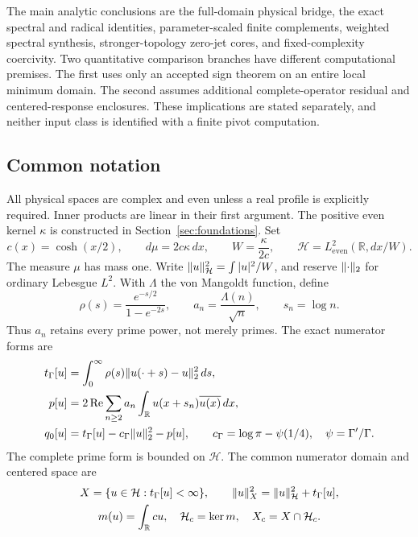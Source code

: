 \documentclass[11pt,a4paper]{article}
\numberwithin{equation}{section}
\theoremstyle{definition}\newtheorem{definition}[theorem]{Definition}
\theoremstyle{remark}\newtheorem{remark}[theorem]{Remark}
\newcommand{\R}{\mathbb R}\newcommand{\C}{\mathbb C}\newcommand{\N}{\mathbb N}
\newcommand{\Hh}{\mathcal H}\newcommand{\Hw}{\mathcal H}
\newcommand{\tg}{t_\Gamma}\newcommand{\cg}{c_\Gamma}
\begin{document}
The main analytic conclusions are the full-domain physical bridge, the exact spectral and radical identities, parameter-scaled finite complements, weighted spectral synthesis, stronger-topology zero-jet cores, and fixed-complexity coercivity. Two quantitative comparison branches have different computational premises. The first uses only an accepted sign theorem on an entire local minimum domain. The second assumes additional complete-operator residual and centered-response enclosures. These implications are stated separately, and neither input class is identified with a finite pivot computation.

\subsection{Common notation}
All physical spaces are complex and even unless a real profile is explicitly required. Inner products are linear in their first argument. The positive even kernel $\kappa$ is constructed in Section~\ref{sec:foundations}. Set
\begin{equation}\label{a:eq:weights}
 c(x)=\cosh(x/2),\qquad d\mu=2c\kappa\,dx,\qquad
 W=\frac{\kappa}{2c},\qquad \Hh=L^2_{\mathrm{even}}(\R,dx/W).
\end{equation}
The measure $\mu$ has mass one. Write $\norm{u}_{\Hh}^2=\int|u|^2/W$, and reserve $\lVert\cdot\rVert_2$ for ordinary Lebesgue $L^2$. With $\Lambda$ the von Mangoldt function, define
\begin{equation}\label{eq:common-shifts}
 \rho(s)=\frac{e^{-s/2}}{1-e^{-2s}},\qquad
 a_n=\frac{\Lambda(n)}{\sqrt n},\qquad s_n=\log n.
\end{equation}
Thus $a_n$ retains every prime power, not merely primes. The exact numerator forms are
\begin{align}
 \tg[u]&=\int_0^\infty\rho(s)\norm{u(\cdot+s)-u}_2^2\,ds,\label{a:eq:physicalgamma}\\
 p[u]&=2\operatorname{Re}\sum_{n\ge2}a_n\int_\R u(x+s_n)\overline{u(x)}\,dx,\label{a:eq:physicalprime}\\
 q_0[u]&=\tg[u]-\cg\norm{u}_2^2-p[u],\qquad
 \cg=\log\pi-\psi(1/4),\quad\psi=\Gamma'/\Gamma.\label{a:eq:qzero}
\end{align}
The complete prime form is bounded on $\Hh$. The common numerator domain and centered space are
\begin{equation}\label{a:eq:X}
 \begin{gathered}
 X=\{u\in\Hh:\tg[u]<\infty\},\qquad
 \norm{u}_X^2=\norm{u}_{\Hh}^2+\tg[u],\\
 m(u)=\int_\R cu,\quad \Hh_c=\ker m,\quad X_c=X\cap\Hh_c.
 \end{gathered}
\end{equation}
\end{document}
